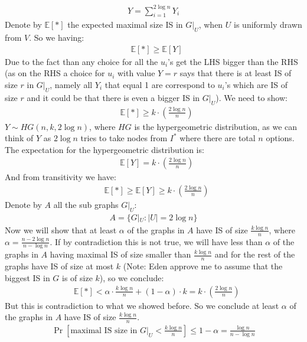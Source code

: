 \documentclass[11pt]{article}
\theoremstyle{plain}
\theoremstyle{nonumberplainnobrackets}
\begin{document}
\begin{align*}
Y = \sum_{i=1}^{2\log n} Y_i
\end{align*}
Denote by $\mathbb{E}[*]$ the expected maximal size IS in $G|_U$, when $U$ is uniformly drawn from $V$. 
So we having:
\begin{align*}
&\mathbb{E}[*] \ge \mathbb{E}[Y]
\end{align*}
Due to the fact than any choice for all the $u_i$'s get the LHS bigger than the RHS (as on the RHS a choice for $u_i$ with value $Y=r$ says that there is at least IS of size $r$ in $G|_U$, namely all $Y_i$ that equal 1 are correspond to $u_i$'s which are IS of size $r$ and it could be that there is even a bigger IS in $G|_U$).
We need to show:
	\begin{align*}
&\mathbb{E}[*] \ge k \cdot(\frac{2\log n}{n} ) 
\end{align*}
$Y\sim HG(n,k,2\log n)$, where $HG$ is the hypergeometric distribution, as we can think of $Y$ as $2 \log n$ tries to take nodes from $I^*$ where there are total $n$ options.
The expectation for the hypergeometric distribution is:
 \begin{align*}
& \mathbb{E}[Y] =  k \cdot(\frac{2\log n}{n} ) 
\end{align*}
And from transitivity we have: 
	\begin{align*}
&\mathbb{E}[*] \ge \mathbb{E}[Y] \ge k \cdot(\frac{2\log n}{n} ) 
\end{align*}
Denote by $A$ all the sub graphs $G|_U$:
\begin{align*}
A= \{ G|_U : |U|=2\log n  \}
\end{align*}
Now we will show that at least $\alpha$ of the graphs in $A$ have IS of size $\frac{k\log n }{n}$, where $\alpha=\frac{n-2\log n}{n-\log n}$. If by contradiction this is not true, we will have less than $\alpha$ of the graphs in $A$ having maximal IS of size smaller than $\frac{k\log n }{n}$ and for the rest of the graphs have IS of size at most $k$ (Note: Eden approve me to assume that the biggest IS in $G$ is of size $k$), so we conclude:
	\begin{align*}
&\mathbb{E}[*] < \alpha \cdot \frac{k\log n}{n}  + (1-\alpha)\cdot k = k \cdot(\frac{2\log n}{n} ) 
\end{align*}
But this is contradiction to what we showed before. So we conclude at least $\alpha$ of the graphs in $A$ have IS of size $\frac{k\log n }{n}$.
\begin{align*}
\Pr[\text{maximal IS size in }G|_U < \frac{k\log n }{n}]\le 1-\alpha = \frac{\log n}{n- \log n}
\end{align*}
\end{document}
